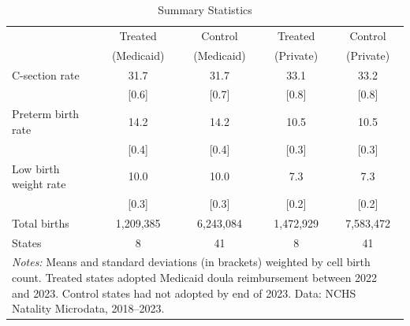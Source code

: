 \begin{table}[t]
\centering
\caption{Summary Statistics}
\label{tab:sumstats}
\begin{tabular}{lcccc}
\hline\hline
 & Treated & Control & Treated & Control \\
 & (Medicaid) & (Medicaid) & (Private) & (Private) \\
\hline
C-section rate & 31.7 & 31.7 & 33.1 & 33.2 \\
 & [0.6] & [0.7] & [0.8] & [0.8] \\
Preterm birth rate & 14.2 & 14.2 & 10.5 & 10.5 \\
 & [0.4] & [0.4] & [0.3] & [0.3] \\
Low birth weight rate & 10.0 & 10.0 & 7.3 & 7.3 \\
 & [0.3] & [0.3] & [0.2] & [0.2] \\
\hline
Total births & 1,209,385 & 6,243,084 & 1,472,929 & 7,583,472 \\
States & 8 & 41 & 8 & 41 \\
\hline\hline
\multicolumn{5}{p{0.95\textwidth}}{\footnotesize \textit{Notes:} Means and standard deviations (in brackets) weighted by cell birth count. Treated states adopted Medicaid doula reimbursement between 2022 and 2023. Control states had not adopted by end of 2023. Data: NCHS Natality Microdata, 2018--2023.}
\end{tabular}
\end{table}


